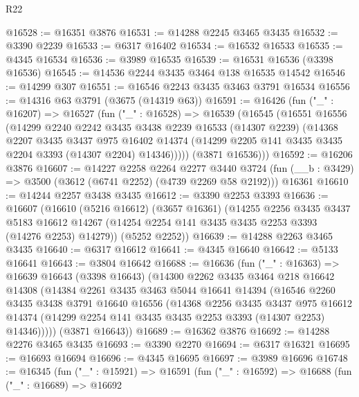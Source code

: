 \begin{lexlean}{R22}
\begin{coremodule}
@16528 := @16351 @3876
@16531 := @14288 @2245 @3465 @3435
@16532 := @3390 @2239
@16533 := @6317 @16402
@16534 := @16532 @16533
@16535 := @4345 @16534
@16536 := @3989 @16535
@16539 := @16531 @16536 (@3398 @16536)
@16545 := @14536 @2244 @3435 @3464 @138 @16535 @14542
@16546 := @14299 @307
@16551 := @16546 @2243 @3435 @3463 @3791 @16534
@16556 := @14316 @63 @3791 (@3675 (@14319 @63))
@16591 := @16426
    (fun ("_" : @16207) =>
    @16527
      (fun ("_" : @16528) =>
      @16539
        (@16545
          (@16551
            @16556
            (@14299
              @2240
              @2242
              @3435
              @3438
              @2239
              @16533
              (@14307 @2239)
              (@14368
                @2207
                @3435
                @3437
                @975
                @16402
                @14374
                (@14299 @2205 @141 @3435 @3435 @2204 @3393 (@14307 @2204) @14346)))))
        (@3871 @16536)))
@16592 := @16206 @3876
@16607 := @14227
    @2258
    @2264
    @2277
    @3440
    @3724
    (fun (__b : @3429) => @3500 (@3612 (@6741 @2252) (@4739 @2269 @58 @2192)))
    @16361
@16610 := @14244 @2257 @3438 @3435
@16612 := @3390 @2253 @3393
@16636 := @16607
    (@16610
      (@5216 @16612)
      (@3657 @16361)
      (@14255
        @2256
        @3435
        @3437
        @5183
        @16612
        @14267
        (@14254 @2254 @141 @3435 @3435 @2253 @3393 (@14276 @2253) @14279))
      (@5252 @2252))
@16639 := @14288 @2263 @3465 @3435
@16640 := @6317 @16612
@16641 := @4345 @16640
@16642 := @5133 @16641
@16643 := @3804 @16642
@16688 := @16636
    (fun ("_" : @16363) =>
    @16639
      @16643
      (@3398 @16643)
      (@14300
        @2262
        @3435
        @3464
        @218
        @16642
        @14308
        (@14384
          @2261
          @3435
          @3463
          @5044
          @16641
          @14394
          (@16546
            @2260
            @3435
            @3438
            @3791
            @16640
            @16556
            (@14368
              @2256
              @3435
              @3437
              @975
              @16612
              @14374
              (@14299 @2254 @141 @3435 @3435 @2253 @3393 (@14307 @2253) @14346)))))
      (@3871 @16643))
@16689 := @16362 @3876
@16692 := @14288 @2276 @3465 @3435
@16693 := @3390 @2270
@16694 := @6317 @16321
@16695 := @16693 @16694
@16696 := @4345 @16695
@16697 := @3989 @16696
@16748 := @16345
    (fun ("_" : @15921) =>
    @16591
      (fun ("_" : @16592) =>
      @16688
        (fun ("_" : @16689) =>
        @16692

\end{coremodule}
\end{lexlean}

